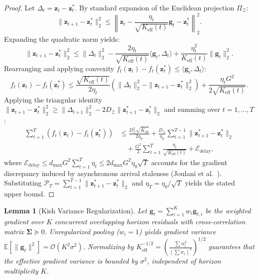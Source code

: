 \documentclass[10pt,journal,compsoc]{IEEEtran}
\newtheorem{lemma}{Lemma}
\begin{document}
\begin{proof}
Let $\Delta_t = \mathbf{z}_t - \mathbf{z}_t^*$. By standard expansion of the Euclidean projection $\Pi_{\mathcal{Z}}$:
\begin{equation}
\|\mathbf{z}_{t+1} - \mathbf{z}_t^*\|_2^2 \le \left\| \mathbf{z}_t - \frac{\eta_t}{\sqrt{K_{\text{eff}}(t)}} \mathbf{g}_t - \mathbf{z}_t^* \right\|_2^2.
\end{equation}
Expanding the quadratic norm yields:
\begin{equation}
\|\mathbf{z}_{t+1} - \mathbf{z}_t^*\|_2^2 \le \|\Delta_t\|_2^2 - \frac{2\eta_t}{\sqrt{K_{\text{eff}}(t)}} \langle \mathbf{g}_t, \Delta_t \rangle + \frac{\eta_t^2}{K_{\text{eff}}(t)} \|\mathbf{g}_t\|_2^2.
\end{equation}
Rearranging and applying convexity $f_t(\mathbf{z}_t) - f_t(\mathbf{z}_t^*) \le \langle \mathbf{g}_t, \Delta_t \rangle$:
\begin{equation}
f_t(\mathbf{z}_t) - f_t(\mathbf{z}_t^*) \le \frac{\sqrt{K_{\text{eff}}(t)}}{2\eta_t} \left( \|\Delta_t\|_2^2 - \|\mathbf{z}_{t+1} - \mathbf{z}_t^*\|_2^2 \right) + \frac{\eta_t G^2}{2\sqrt{K_{\text{eff}}(t)}}.
\end{equation}
Applying the triangular identity $\|\mathbf{z}_{t+1} - \mathbf{z}_t^*\|_2^2 \ge \|\Delta_{t+1}\|_2^2 - 2 D_{\mathcal{Z}} \|\mathbf{z}_{t+1}^* - \mathbf{z}_t^*\|_2$ and summing over $t = 1, \dots, T$:
\begin{align}
\sum_{t=1}^T \left( f_t(\mathbf{z}_t) - f_t(\mathbf{z}_t^*) \right) &\le \frac{D_{\mathcal{Z}}^2 \sqrt{\bar{K}_{\text{eff}}}}{2 \eta_T} + \frac{D_{\mathcal{Z}}}{\eta_T} \sum_{t=1}^{T-1} \|\mathbf{z}_{t+1}^* - \mathbf{z}_t^*\|_2 \nonumber \\
&\quad + \frac{G^2}{2} \sum_{t=1}^T \frac{\eta_t}{\sqrt{K_{\text{eff}}(t)}} + \mathcal{E}_{\text{delay}},
\end{align}
where $\mathcal{E}_{\text{delay}} \le d_{\max} G^2 \sum_{t=1}^T \eta_t \le 2 d_{\max} G^2 \eta_0 \sqrt{T}$ accounts for the gradient discrepancy induced by asynchronous arrival staleness (Joulani et al.~\cite{joulani2016delay}). Substituting $\mathcal{P}_T = \sum_{t=1}^{T-1} \|\mathbf{z}_{t+1}^* - \mathbf{z}_t^*\|_2$ and $\eta_T = \eta_0 / \sqrt{T}$ yields the stated upper bound.
\end{proof}

\begin{lemma}[Kish Variance Regularization]
\label{lem:kish_variance}
Let $\mathbf{g}_t = \sum_{i=1}^K w_i \mathbf{g}_{t, i}$ be the weighted gradient over $K$ concurrent overlapping horizon residuals with cross-correlation matrix $\mathbf{\Sigma} \succeq 0$. Unregularized pooling ($w_i = 1$) yields gradient variance $\mathbb{E}[\|\mathbf{g}_t\|^2] = \mathcal{O}(K^2 \sigma^2)$. Normalizing by $K_{\text{eff}}^{-1/2} = \left(\frac{\sum w_i^2}{(\sum w_i)^2}\right)^{1/2}$ guarantees that the effective gradient variance is bounded by $\sigma^2$, independent of horizon multiplicity $K$.
\end{lemma}
\end{document}
